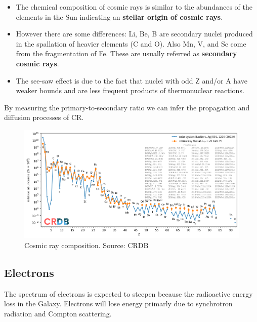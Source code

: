 \documentclass[
  letterpaper,
  DIV=11,
  numbers=noendperiod]{scrreprt}
\providecommand{\tightlist}{%
  \setlength{\itemsep}{0pt}\setlength{\parskip}{0pt}}\usepackage{longtable,booktabs,array}
\begin{document}
\begin{itemize}
\tightlist
\item
  The chemical composition of cosmic rays is similar to the abundances
  of the elements in the Sun indicating an \textbf{stellar origin of
  cosmic rays}.
\item
  However there are some differences: Li, Be, B are secondary nuclei
  produced in the spallation of heavier elements (C and O). Also Mn, V,
  and Sc come from the fragmentation of Fe. These are usually referred
  as \textbf{secondary cosmic rays}.
\item
  The see-saw effect is due to the fact that nuclei with odd Z and/or A
  have weaker bounds and are less frequent products of thermonuclear
  reactions.
\end{itemize}

By measuring the primary-to-secondary ratio we can infer the propagation
and diffusion processes of CR.

\begin{figure}[H]

{\centering \includegraphics{images/composition_2.png}

}

\caption{Cosmic ray composition. Source: CRDB}

\end{figure}%

\subsection{Electrons}\label{electrons}

The spectrum of electrons is expected to steepen because the radioactive
energy loss in the Galaxy. Electrons will lose energy primarly due to
synchrotron radiation and Compton scattering.
\end{document}
